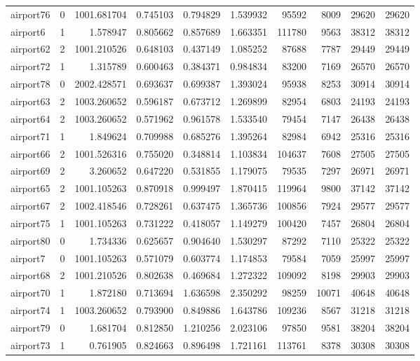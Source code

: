 \begin{longtable}{|l|r|r|r|r|r|r|r|r|r|}
airport76 & 0 & 1001.681704 & 0.745103 & 0.794829 & 1.539932 & 95592 & 8009 & 29620 & 29620 \\
airport6 & 1 & 1.578947 & 0.805662 & 0.857689 & 1.663351 & 111780 & 9563 & 38312 & 38312 \\
airport62 & 2 & 1001.210526 & 0.648103 & 0.437149 & 1.085252 & 87688 & 7787 & 29449 & 29449 \\
airport72 & 1 & 1.315789 & 0.600463 & 0.384371 & 0.984834 & 83200 & 7169 & 26570 & 26570 \\
airport78 & 0 & 2002.428571 & 0.693637 & 0.699387 & 1.393024 & 95938 & 8253 & 30914 & 30914 \\
airport63 & 2 & 1003.260652 & 0.596187 & 0.673712 & 1.269899 & 82954 & 6803 & 24193 & 24193 \\
airport64 & 2 & 1003.260652 & 0.571962 & 0.961578 & 1.533540 & 79454 & 7147 & 26438 & 26438 \\
airport71 & 1 & 1.849624 & 0.709988 & 0.685276 & 1.395264 & 82984 & 6942 & 25316 & 25316 \\
airport66 & 2 & 1001.526316 & 0.755020 & 0.348814 & 1.103834 & 104637 & 7608 & 27505 & 27505 \\
airport69 & 2 & 3.260652 & 0.647220 & 0.531855 & 1.179075 & 79535 & 7297 & 26971 & 26971 \\
airport65 & 2 & 1001.105263 & 0.870918 & 0.999497 & 1.870415 & 119964 & 9800 & 37142 & 37142 \\
airport67 & 2 & 1002.418546 & 0.728261 & 0.637475 & 1.365736 & 100856 & 7924 & 29577 & 29577 \\
airport75 & 1 & 1001.105263 & 0.731222 & 0.418057 & 1.149279 & 100420 & 7457 & 26804 & 26804 \\
airport80 & 0 & 1.734336 & 0.625657 & 0.904640 & 1.530297 & 87292 & 7110 & 25322 & 25322 \\
airport7 & 0 & 1001.105263 & 0.571079 & 0.603774 & 1.174853 & 79584 & 7059 & 25997 & 25997 \\
airport68 & 2 & 1001.210526 & 0.802638 & 0.469684 & 1.272322 & 109092 & 8198 & 29903 & 29903 \\
airport70 & 1 & 1.872180 & 0.713694 & 1.636598 & 2.350292 & 98259 & 10071 & 40648 & 40648 \\
airport74 & 1 & 1003.260652 & 0.793900 & 0.849886 & 1.643786 & 109236 & 8567 & 31218 & 31218 \\
airport79 & 0 & 1.681704 & 0.812850 & 1.210256 & 2.023106 & 97850 & 9581 & 38204 & 38204 \\
airport73 & 1 & 0.761905 & 0.824663 & 0.896498 & 1.721161 & 113761 & 8378 & 30308 & 30308 \\

\end{longtable}
